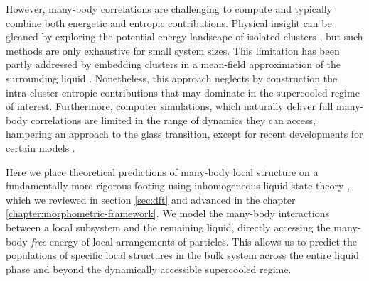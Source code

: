\documentclass[11pt,twoside]{report}
\begin{document}
However, many-body correlations are challenging to compute and typically combine both energetic and entropic contributions.
Physical insight can be gleaned by exploring the potential energy landscape of isolated clusters \cite{Wales2004,ArkusPRL2009}, but such methods are only exhaustive for small system sizes.
This limitation has been partly addressed by embedding clusters in a mean-field approximation of the surrounding liquid \cite{MossaJCP2003,MossaJNS2006}.
Nonetheless, this approach neglects by construction the intra-cluster entropic contributions that may dominate in the supercooled regime of interest.
Furthermore, computer simulations, which naturally deliver full many-body correlations are limited in the range of dynamics they can access, hampering an approach to the glass transition, except for recent developments for certain models \cite{BerthierPRL2016}.

Here we place theoretical predictions of many-body local structure on a fundamentally more rigorous footing using inhomogeneous liquid state theory \cite{EvansAP1979}, which we reviewed in section \ref{sec:dft} and advanced in the chapter \ref{chapter:morphometric-framework}.
We model the many-body interactions between a local subsystem and the remaining liquid, directly accessing the many-body \textit{free} energy of local arrangements of particles.
This allows us to predict the populations of specific local structures in the bulk system across the entire liquid phase and beyond the dynamically accessible supercooled regime.
\end{document}
